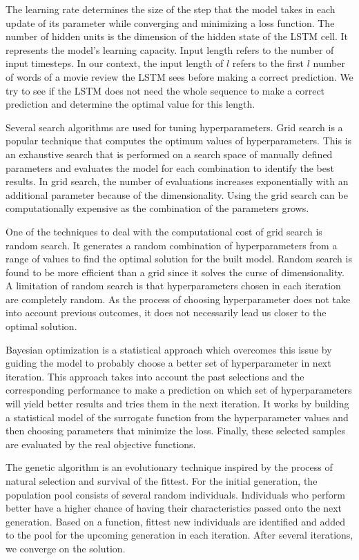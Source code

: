\documentclass[conference]{IEEEtran}
\begin{document}
The learning rate determines the size of the step that the model takes in each update of its parameter while converging and minimizing a loss function. The number of hidden units is the dimension of the hidden state of the LSTM cell. It represents the model's learning capacity. Input length refers to the number of input timesteps. In our context, the input length of $l$ refers to the first $l$ number of words of a movie review the LSTM sees before making a correct prediction. We try to see if the LSTM does not need the whole sequence to make a correct prediction and determine the optimal value for this length.  

Several search algorithms are used for tuning hyperparameters. Grid search is a popular technique that computes the optimum values of hyperparameters. This is an exhaustive search that is performed on a search space of manually defined parameters and evaluates the model for each combination to identify the best results. In grid search, the number of evaluations increases exponentially with an additional parameter because of the dimensionality. Using the grid search can be computationally expensive as the combination of the parameters grows.

One of the techniques to deal with the computational cost of grid search is random search. It generates a random combination of hyperparameters from a range of values to find the optimal solution for the built model. Random search is found to be more efficient than a grid \cite{random} since it solves the curse of dimensionality. A limitation of random search is that hyperparameters chosen in each iteration are completely random. As the process of choosing hyperparameter does not take into account previous outcomes, it does not necessarily lead us closer to the optimal solution.

Bayesian optimization is a statistical approach which overcomes this issue by guiding the model to probably choose a better set of hyperparameter in next iteration. This approach takes into account the past selections and the corresponding performance to make a prediction on which set of hyperparameters will yield better results and tries them in the next iteration. It works by building a statistical model of the surrogate function from the hyperparameter values and then choosing parameters that minimize the loss. Finally, these selected samples are evaluated by the real objective functions.


The genetic algorithm is an evolutionary technique inspired by the process of natural selection and survival of the fittest. For the initial generation, the population pool consists of several random individuals. Individuals who perform better have a higher chance of having their characteristics passed onto the next generation. Based on a function, fittest new individuals are identified and added to the pool for the upcoming generation in each iteration. After several iterations, we converge on the solution.
\end{document}
